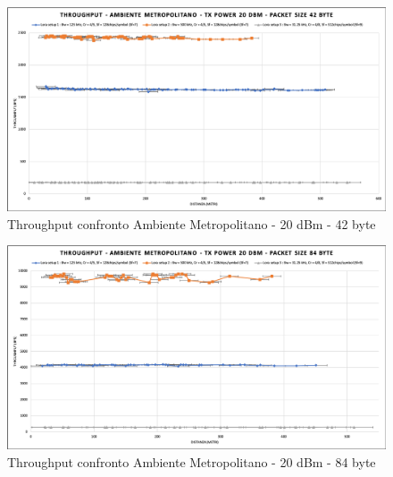 \documentclass[12pt,a4paper,openright,twoside]{report}
\begin{document}
\begin{figure}[h]                      
\begin{center} 
\includegraphics[width=\textwidth]{THROUGHPUT_confronto_AM_20dBm_42byte.png}
\caption[Throughput confronto Ambiente Metropolitano - 20 dBm - 42 byte]{Throughput confronto Ambiente Metropolitano - 20 dBm - 42 byte}\label{fig:prima}
\end{center}
\end{figure}

\begin{figure}[h]                      
\begin{center} 
\includegraphics[width=\textwidth]{THROUGHPUT_confronto_AM_20dBm_84byte.png}
\caption[Throughput confronto Ambiente Metropolitano - 20 dBm - 84 byte]{Throughput confronto Ambiente Metropolitano - 20 dBm - 84 byte}\label{fig:prima}
\end{center}
\end{figure}




%
\end{document}
